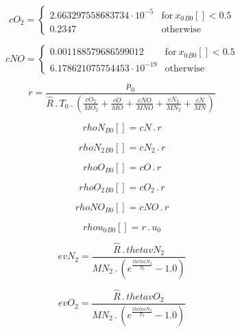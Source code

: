 \documentclass{article}
\begin{document}
\begin{dmath}cO_{2} = \begin{cases} 2.663297558683734 \cdot 10^{-5} & \text{for}\: {x_{0}{_{B0}}}[{}] < 0.5 \\0.2347 & \text{otherwise} \end{cases}\end{dmath}

\begin{dmath}cNO = \begin{cases} 0.001188579686599012 & \text{for}\: {x_{0}{_{B0}}}[{}] < 0.5 \\6.178621075754453 \cdot 10^{-19} & \text{otherwise} \end{cases}\end{dmath}

\begin{dmath}r = \frac{p_{0}}{\hat{R} \,.\, T_{0} \,.\, \left(\frac{cO_{2}}{MO_{2}} + \frac{cO}{MO} + \frac{cNO}{MNO} + \frac{cN_{2}}{MN_{2}} + \frac{cN}{MN}\right)}\end{dmath}

\begin{dmath}{rhoN{_{B0}}}[{}] = cN \,.\, r\end{dmath}

\begin{dmath}{rhoN_{2}{_{B0}}}[{}] = cN_{2} \,.\, r\end{dmath}

\begin{dmath}{rhoO{_{B0}}}[{}] = cO \,.\, r\end{dmath}

\begin{dmath}{rhoO_{2}{_{B0}}}[{}] = cO_{2} \,.\, r\end{dmath}

\begin{dmath}{rhoNO{_{B0}}}[{}] = cNO \,.\, r\end{dmath}

\begin{dmath}{rhou_{0}{_{B0}}}[{}] = r \,.\, u_{0}\end{dmath}

\begin{dmath}evN_{2} = \frac{\hat{R} \,.\, thetavN_{2}}{MN_{2} \,.\, \left(e^{\frac{thetavN_{2}}{T_{0}}} - 1.0\right)}\end{dmath}

\begin{dmath}evO_{2} = \frac{\hat{R} \,.\, thetavO_{2}}{MN_{2} \,.\, \left(e^{\frac{thetavN_{2}}{T_{0}}} - 1.0\right)}\end{dmath}
\end{document}
